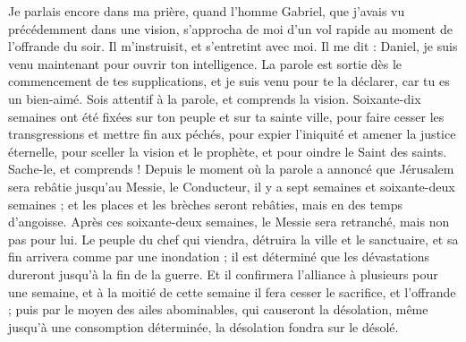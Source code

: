 \begin{multicols}{2}
Je parlais encore dans ma prière, quand l’homme Gabriel, que j'avais vu précédemment dans une vision, s’approcha de moi d’un vol rapide au moment de l’offrande du soir.
Il m'instruisit, et s’entretint avec moi.  Il me dit : Daniel, je suis venu maintenant pour ouvrir ton intelligence.
La parole est sortie dès le commencement de tes supplications, et je suis venu pour te la déclarer, car tu es un bien-aimé. Sois attentif à la parole, et comprends la vision.
Soixante-dix semaines ont été fixées sur ton peuple et sur ta sainte ville, pour faire cesser les transgressions et mettre fin aux péchés, pour expier l'iniquité et amener la justice éternelle, pour sceller la vision et le prophète, et pour oindre le Saint des saints.
Sache-le, et comprends ! Depuis le moment où la parole a annoncé que Jérusalem sera rebâtie jusqu'au Messie, le Conducteur, il y a sept semaines et soixante-deux semaines ; et les places et les brèches seront rebâties, mais en des temps d'angoisse.
Après ces soixante-deux semaines, le Messie sera retranché, mais non pas pour lui. Le peuple du chef qui viendra, détruira la ville et le sanctuaire, et sa fin arrivera comme par une inondation ; il est déterminé que les dévastations dureront jusqu'à la fin de la guerre.
Et il confirmera l'alliance à plusieurs pour une semaine, et à la moitié de cette semaine il fera cesser le sacrifice, et l’offrande ; puis par le moyen des ailes abominables, qui causeront la désolation, même jusqu'à une consomption déterminée, la désolation fondra sur le désolé.

\end{multicols}
